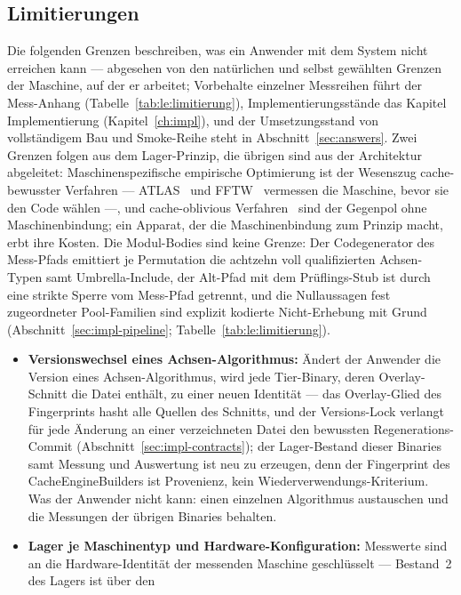 \begin{nurlang}
\section{Limitierungen}\label{sec:limitations}
Die folgenden Grenzen beschreiben, was ein Anwender mit dem System nicht erreichen kann --- abgesehen
von den natürlichen und selbst gewählten Grenzen der Maschine, auf der er arbeitet; Vorbehalte
einzelner Messreihen führt der Mess-Anhang (Tabelle~\ref{tab:le:limitierung}), Implementierungsstände
das Kapitel Implementierung (Kapitel~\ref{ch:impl}), und der Umsetzungsstand von vollständigem Bau und
Smoke-Reihe steht in Abschnitt~\ref{sec:answers}. Zwei Grenzen folgen aus dem Lager-Prinzip, die
übrigen sind aus der Architektur abgeleitet: Maschinenspezifische empirische Optimierung ist der
Wesenszug cache-bewusster Verfahren --- ATLAS~\cite{whaley2001atlas} und FFTW~\cite{frigo1998fftw}
vermessen die Maschine, bevor sie den Code wählen ---, und cache-oblivious Verfahren~\cite{frigo1999cache}
sind der Gegenpol ohne Maschinenbindung; ein Apparat, der die Maschinenbindung zum Prinzip macht, erbt
ihre Kosten. Die Modul-Bodies sind keine Grenze: Der Codegenerator des Mess-Pfads emittiert je
Permutation die achtzehn voll qualifizierten Achsen-Typen samt Umbrella-Include, der Alt-Pfad mit dem
Prüflings-Stub ist durch eine strikte Sperre vom Mess-Pfad getrennt, und die Nullaussagen fest zugeordneter
Pool-Familien sind explizit kodierte Nicht-Erhebung mit Grund (Abschnitt~\ref{sec:impl-pipeline};
Tabelle~\ref{tab:le:limitierung}).
\begin{itemize}
  \item \textbf{Versionswechsel eines Achsen-Algorithmus:} Ändert der Anwender die Version eines
  Achsen-Algorithmus, wird jede Tier-Binary, deren Overlay-Schnitt die Datei enthält, zu einer neuen
  Identität --- das Overlay-Glied des Fingerprints hasht alle Quellen des Schnitts, und der Versions-Lock
  verlangt für jede Änderung an einer verzeichneten Datei den bewussten Regenerations-Commit
  (Abschnitt~\ref{sec:impl-contracts}); der Lager-Bestand dieser Binaries samt Messung und Auswertung
  ist neu zu erzeugen, denn der Fingerprint des CacheEngineBuilders ist Provenienz, kein
  Wiederverwendungs-Kriterium. Was der Anwender nicht kann: einen einzelnen Algorithmus austauschen und
  die Messungen der übrigen Binaries behalten.
  \item \textbf{Lager je Maschinentyp und Hardware-Konfiguration:} Messwerte sind an die
  Hardware-Identität der messenden Maschine geschlüsselt --- Bestand~2 des Lagers ist über den

\end{itemize}
\end{nurlang}
